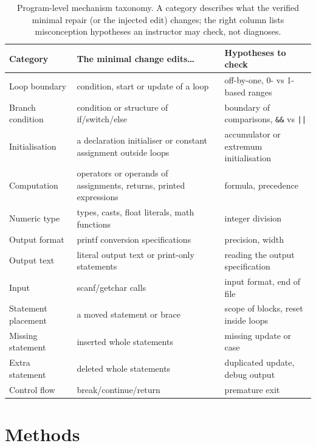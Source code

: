 \begin{table}[t]
\centering
\caption{Program-level mechanism taxonomy. A category describes what the verified minimal repair (or the injected edit) changes; the right column lists misconception hypotheses an instructor may check, not diagnoses.}\label{tab:taxonomy}
\small
\begin{tabular}{p{2.9cm}p{4.9cm}p{4.6cm}}
\toprule
Category & The minimal change edits\dots & Hypotheses to check \\
\midrule
Loop boundary & condition, start or update of a loop & off-by-one, 0- vs 1-based ranges \\
Branch condition & condition or structure of if/switch/else & boundary of comparisons, \texttt{\&\&} vs \texttt{||} \\
Initialisation & a declaration initialiser or constant assignment outside loops & accumulator or extremum initialisation \\
Computation & operators or operands of assignments, returns, printed expressions & formula, precedence \\
Numeric type & types, casts, float literals, math functions & integer division \\
Output format & printf conversion specifications & precision, width \\
Output text & literal output text or print-only statements & reading the output specification \\
Input & scanf/getchar calls & input format, end of file \\
Statement placement & a moved statement or brace & scope of blocks, reset inside loops \\
Missing statement & inserted whole statements & missing update or case \\
Extra statement & deleted whole statements & duplicated update, debug output \\
Control flow & break/continue/return & premature exit \\
\bottomrule
\end{tabular}
\end{table}

\section{Methods}\label{sec:methods}

